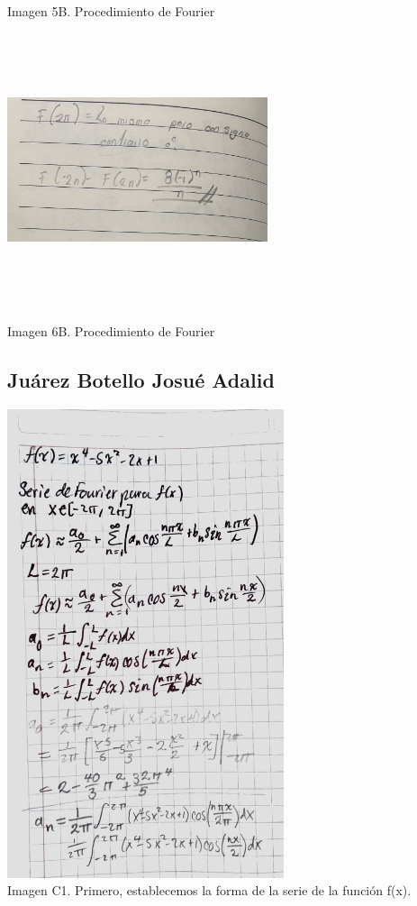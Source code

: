 Imagen 5B. Procedimiento de Fourier

\includegraphics[width=3.00684in,height=3.1593in]{media/image46.jpg}

Imagen 6B. Procedimiento de Fourier

\subsection{Juárez Botello Josué Adalid}\label{juuxe1rez-botello-josuuxe9-adalid}

\includegraphics[width=3.19696in,height=5.41146in]{media/image44.jpg}\\ Imagen C1. Primero, establecemos la forma de la serie de la función f(x).

